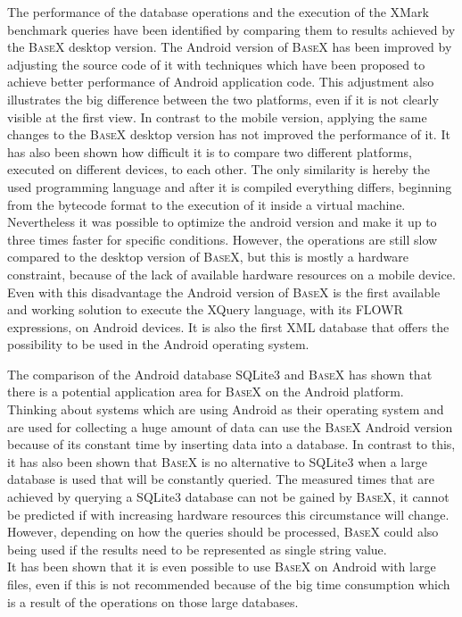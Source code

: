 The performance of the database operations and the execution of the XMark benchmark queries have been identified by comparing them to results achieved by the \textsc{BaseX} desktop version.
The Android version of \textsc{BaseX} has been improved by adjusting the source code of it with techniques which have been proposed to achieve better performance of Android application code.
This adjustment also illustrates the big difference between the two platforms, even if it is not clearly visible at the first view.
In contrast to the mobile version, applying the same changes to the \textsc{BaseX} desktop version has not improved the performance of it.
It has also been shown how difficult it is to compare two different platforms, executed on different devices, to each other.
The only similarity is hereby the used programming language and after it is compiled everything differs, beginning from the bytecode format to the execution of it inside a virtual machine.
Nevertheless it was possible to optimize the android version and make it up to three times faster for specific conditions.
However, the operations are still slow compared to the desktop version of \textsc{BaseX}, but this is mostly a hardware constraint, because of the lack of available hardware resources on a mobile device.
Even with this disadvantage the Android version of \textsc{BaseX} is the first available and working solution to execute the XQuery language, with its FLOWR expressions, on Android devices.
It is also the first XML database that offers the possibility to be used in the Android operating system.


The comparison of the Android database SQLite3 and \textsc{BaseX} has shown that there is a potential application area for \textsc{BaseX} on the Android platform.
Thinking about systems which are using Android as their operating system and are used for collecting a huge amount of data can use the \textsc{BaseX} Android version because of its constant time by inserting data into a database. 
In contrast to this, it has also been shown that \textsc{BaseX} is no alternative to SQLite3 when a large database is used that will be constantly queried.
The measured times that are achieved by querying a SQLite3 database can not be gained by \textsc{BaseX}, it cannot be predicted if with increasing hardware resources this circumstance will change.
However, depending on how the queries should be processed, \textsc{BaseX} could also being used if the results need to be represented as single string value.\\
It has been shown that it is even possible to use \textsc{BaseX} on Android with large files, even if this is not recommended because of the big time consumption which is a result of the operations on those large databases.

